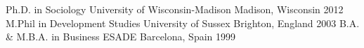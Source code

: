 \begin{cventries}
  \cveducation
    {Ph.D. in Sociology}
    {University of Wisconsin-Madison}
    {Madison, Wisconsin}
    {2012}
  \cveducation
    {M.Phil in Development Studies}
    {University of Sussex}
    {Brighton, England}
    {2003}
  \cveducation
    {B.A. \& M.B.A. in Business}
    {ESADE}
    {Barcelona, Spain}
    {1999}
\end{cventries}
